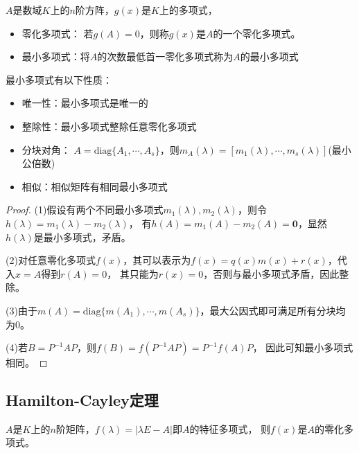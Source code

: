\begin{definition}[零化多项式与最小多项式]
  $A$是数域$K$上的$n$阶方阵，$g(x)$是$K$上的多项式，
  \begin{itemize}
  \item 零化多项式： 若$g(A) = 0$，则称$g(x)$是$A$的一个零化多项式。
  \item 最小多项式：将$A$的次数最低首一零化多项式称为$A$的最小多项式
  \end{itemize}
\end{definition}

\begin{theorem}[最小多项式的性质]
  最小多项式有以下性质：
  \begin{itemize}
  \item 唯一性：最小多项式是唯一的
  \item 整除性：最小多项式整除任意零化多项式
  \item 分块对角：
    $A = \text{diag}\{A_1,\cdots,A_s\}$，则$m_A(\lambda) = [m_1(\lambda),\cdots,m_s(\lambda)]$(最小公倍数)
  \item 相似：相似矩阵有相同最小多项式
  \end{itemize}
\end{theorem}

\begin{proof}
  (1)假设有两个不同最小多项式$m_1(\lambda), m_2(\lambda)$，则令$h(\lambda) = m_1(\lambda) - m_2(\lambda)$，
  有$h( A) = m_1( A) - m_2( A) = \mathbf{0}$，显然$h(\lambda)$是最小多项式，矛盾。

  (2)对任意零化多项式$f(x)$，其可以表示为$f(x) = q(x)m(x) + r(x)$，代入$x = A$得到$r(A) = 0$，
  其只能为$r(x) = 0$，否则与最小多项式矛盾，因此整除。

  (3)由于$m(A) = \text{diag}\{m(A_1),\cdots,m(A_s)\}$，最大公因式即可满足所有分块均为$0$。

  (4)若$B = P^{-1}AP$，则$f(B) = f(P^{-1}AP) = P^{-1}f(A) P$，
  因此可知最小多项式相同。
\end{proof}

\subsection{Hamilton-Cayley定理}

\begin{theorem}
  $A$是$K$上的$n$阶矩阵，$f(\lambda) = |\lambda E - A|$即$A$的特征多项式，
  则$f(x)$是$A$的零化多项式。
\end{theorem}

